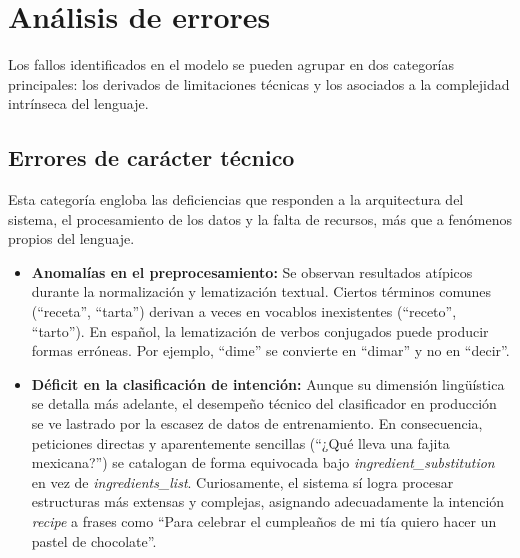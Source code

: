 \documentclass[11pt,a4paper,twoside]{article}
\theoremstyle{definition}
\numberwithin{equation}{section}
\begin{document}
\section{Análisis de errores}
Los fallos identificados en el modelo se pueden agrupar en dos categorías principales: los derivados de limitaciones técnicas y los asociados a la complejidad intrínseca del lenguaje.

\subsection{Errores de carácter técnico}
Esta categoría engloba las deficiencias que responden a la arquitectura del sistema, el procesamiento de los datos y la falta de recursos, más que a fenómenos propios del lenguaje. 
\begin{itemize}
	\item \textbf{Anomalías en el preprocesamiento:} Se observan resultados atípicos durante la normalización y lematización textual. Ciertos términos comunes (``receta'', ``tarta'') derivan a veces en vocablos inexistentes (``receto'', ``tarto''). En español, la lematización de verbos conjugados puede producir formas erróneas. Por ejemplo, ``dime'' se convierte en ``dimar'' y no en ``decir''.
	
	\item \textbf{Déficit en la clasificación de intención:} Aunque su dimensión lingüística se detalla más adelante, el desempeño técnico del clasificador en producción se ve lastrado por la escasez de datos de entrenamiento. En consecuencia, peticiones directas y aparentemente sencillas (``¿Qué lleva una fajita mexicana?'') se catalogan de forma equivocada bajo \textit{ingredient\_substitution} en vez de \textit{ingredients\_list}. Curiosamente, el sistema sí logra procesar estructuras más extensas y complejas, asignando adecuadamente la intención \textit{recipe} a frases como ``Para celebrar el cumpleaños de mi tía quiero hacer un pastel de chocolate''.
\end{itemize}
\end{document}
